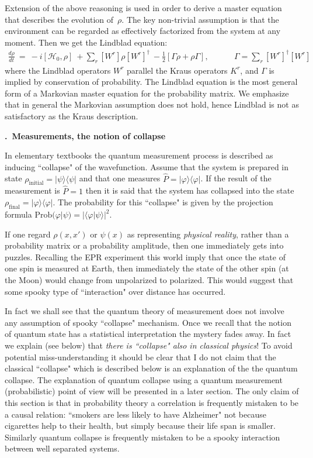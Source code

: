 \documentclass[onecolumn,fleqn, 11pt]{revtex4}
\newcommand{\tbox}[1]{\text{#1}}
\newcommand{\beq}{\begin{eqnarray}}
\newcommand{\eeq}{\end{eqnarray}}
\renewcommand{\thesubsection}{\arabic{subsection}}
\renewcommand{\thesubsubsection}{\arabic{subsubsection}}
\newcommand{\sheadC}[1]
{
\addtocounter{subsubsection}{1}
\vspace{5mm}
{\bf \thesubsection.\thesubsubsection \ #1}  
\nopagebreak
\phantomsection
}
\begin{document}
Extension of the above reasoning is used in order to 
derive a master equation that describes the 
evolution of~$\rho$. The key non-trivial assumption 
is that the environment can be regarded as 
effectively factorized from the system at any moment.
Then we get the Lindblad equation:
\beq 
\frac{d\rho}{dt} \ = \  -i[\mathcal{H}_0,\rho] 
\ + \sum_r [W^r] \rho [W^r]^{\dagger} 
\ - \frac{1}{2}\left[\Gamma\rho + \rho \Gamma \right],
\ \ \ \ \ \ \ \ \ \ \ \ \ \ 
\Gamma=\sum_r [W^r]^{\dagger}[W^r]
\eeq
where the Lindblad operators $W^r$ parallel the Kraus operators $K^r$, 
and $\Gamma$ is implied by conservation of probability.
The Lindblad equation is the most general form of 
a Markovian master equation for the probability matrix.
We emphasize that in general the Markovian assumption 
does not hold, hence Lindblad is not as satisfactory as the Kraus description.  


\sheadC{Measurements, the notion of collapse}

In elementary textbooks the quantum measurement process 
is described as inducing ``collapse" of the wavefunction. 
Assume that the system is prepared in state 
${\rho_{\tbox{initial}}=|\psi\rangle \langle \psi|}$ and that one 
measures ${\hat{P}=|\varphi\rangle \langle \varphi|}$. If the result 
of the measurement is $\hat{P}=1$ then it is said 
that the system has collapsed into the 
state  ${\rho_{\tbox{final}}=|\varphi\rangle \langle \varphi|}$. 
The probability for this ``collapse" is given by the projection 
formula ${\mbox{Prob}(\varphi | \psi) = |\langle \varphi | \psi \rangle|^2}$.

If one regard $\rho(x,x')$ or $\psi(x)$ as representing {\em physical reality},  
rather than a probability matrix or a probability amplitude, 
then one immediately gets into puzzles. Recalling the EPR experiment 
this world imply that once the state of one spin is measured at Earth, 
then immediately the state of the other spin (at the Moon) 
would change from unpolarized to polarized.  This would suggest that 
some spooky type of ``interaction" over distance has occurred. 

In fact we shall see that the quantum theory of measurement 
does not involve any assumption of spooky ``collapse" mechanism. 
Once we recall that the notion of quantum state has 
a statistical interpretation the mystery fades away. 
In fact we explain (see below) that {\em there is ``collapse" also in classical physics}!
To avoid potential miss-understanding it should be clear 
that I do not claim that the classical ``collapse" 
which is described below is an explanation of the 
the quantum collapse. The explanation of quantum collapse  
using a quantum measurement (probabilistic) point of view will 
be presented in a later section. The only claim of this section 
is that in probability theory a correlation is frequently mistaken 
to be a causal relation: ``smokers are less likely to have Alzheimer" not because cigarettes 
help to their health, but simply because their life span is smaller. 
Similarly quantum collapse is frequently mistaken to 
be a spooky interaction between well separated systems.
   
\end{document}
